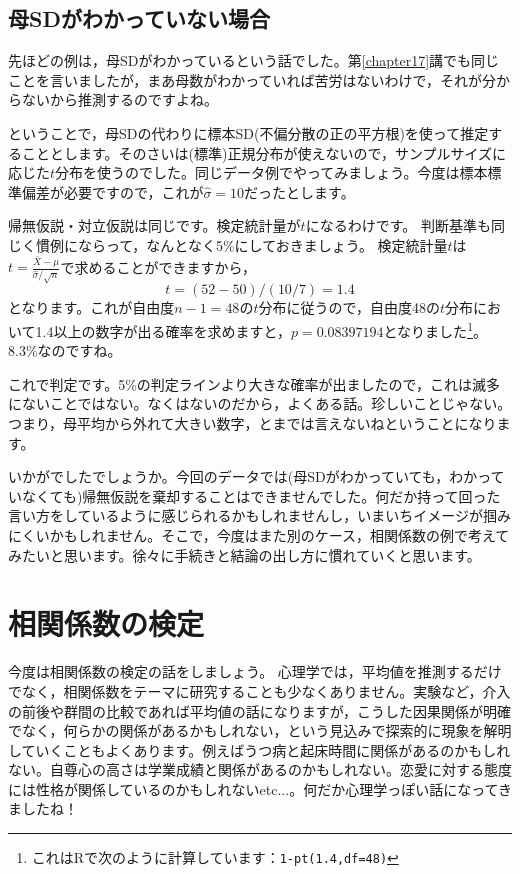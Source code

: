 \documentclass{ltjsarticle}
\begin{document}
\subsection{母SDがわかっていない場合}
先ほどの例は，母SDがわかっているという話でした。第\ref{chapter17}講でも同じことを言いましたが，まあ母数がわかっていれば苦労はないわけで，それが分からないから推測するのですよね。

ということで，母SDの代わりに標本SD(不偏分散の正の平方根)を使って推定することとします。そのさいは(標準)正規分布が使えないので，サンプルサイズに応じた$t$分布を使うのでした。同じデータ例でやってみましょう。今度は標本標準偏差が必要ですので，これが$\hat{\sigma}=10$だったとします。

帰無仮説・対立仮説は同じです。検定統計量が$t$になるわけです。
判断基準も同じく慣例にならって，なんとなく5\%にしておきましょう。
検定統計量$t$は$t = \frac{\bar{X}-\mu}{\hat{\sigma}/\sqrt{n}}$で求めることができますから，
$$ t = (52-50)/(10/7) = 1.4 $$
となります。これが自由度$n-1=48$の$t$分布に従うので，自由度48の$t$分布において1.4以上の数字が出る確率を求めますと，$p=0.08397194$となりました\footnote{これはRで次のように計算しています：\texttt{1-pt(1.4,df=48)}}。8.3\%なのですね。

これで判定です。5\%の判定ラインより大きな確率が出ましたので，これは滅多にないことではない。なくはないのだから，よくある話。珍しいことじゃない。つまり，母平均から外れて大きい数字，とまでは言えないねということになります。

いかがでしたでしょうか。今回のデータでは(母SDがわかっていても，わかっていなくても)帰無仮説を棄却することはできませんでした。何だか持って回った言い方をしているように感じられるかもしれませんし，いまいちイメージが掴みにくいかもしれません。そこで，今度はまた別のケース，相関係数の例で考えてみたいと思います。徐々に手続きと結論の出し方に慣れていくと思います。

\section{相関係数の検定}
今度は相関係数の検定の話をしましょう。
心理学では，平均値を推測するだけでなく，相関係数をテーマに研究することも少なくありません。実験など，介入の前後や群間の比較であれば平均値の話になりますが，こうした因果関係が明確でなく，何らかの関係があるかもしれない，という見込みで探索的に現象を解明していくこともよくあります。例えばうつ病と起床時間に関係があるのかもしれない。自尊心の高さは学業成績と関係があるのかもしれない。恋愛に対する態度には性格が関係しているのかもしれないetc...。何だか心理学っぽい話になってきましたね！
\end{document}
